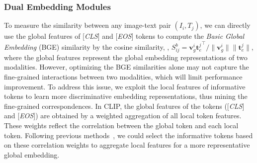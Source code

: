 \documentclass[10pt,twocolumn,letterpaper]{article}
\begin{document}
\subsubsection{Dual Embedding Modules} To measure the similarity between any image-text pair $(I_i,T_j)$, we can directly use the global features of [\emph{CLS}] and [\emph{EOS}] tokens to compute the \emph{Basic Global Embedding} (BGE) similarity by the cosine similarity, \ie, $S^b_{ij} = {{\boldsymbol{v}^i_g}{\boldsymbol{t}^j_e}^\top} \big/{\|\boldsymbol{v}^i_g\|\|\boldsymbol{t}^j_e\|}$, where the global features represent the global embedding representations of two modalities. However, optimizing the BGE similarities alone may not capture the fine-grained interactions between two modalities, which will limit performance improvement. To address this issue, we exploit the local features of informative tokens to learn more discriminative embedding representations, thus mining the fine-grained correspondences. In CLIP, the global features of the tokens ([\emph{CLS}] and [\emph{EOS}]) are obtained by a weighted aggregation of all local token features. These weights reflect the correlation between the global token and each local token. Following previous methods~\cite{yan2022clip,zhu2022dual}, we could select the informative tokens based on these correlation weights to aggregate local features for a more representative global embedding.
\end{document}
